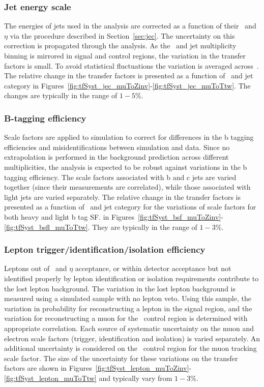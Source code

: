 \subsubsection{Jet energy scale}
\label{sec:tfSyst_jec}
The energies of jets used in the analysis are corrected as a function of their \pt~and
$\eta$ via the procedure described in Section~\ref{sec:jec}. The uncertainty on
this correction is propagated through the analysis. As the \scalht~and jet multiplicity binning is 
mirrored in signal and control regions, the variation in the transfer factors is small.
To avoid statistical fluctuations the variation is averaged across~\nb. The relative change 
in the transfer factors is presented as a function of \scalht~and jet category 
in Figures~\ref{fig:tfSyst_jec_muToZinv}-\ref{fig:tfSyst_jec_muToTtw}.
The changes are typically in the range of $1-5\%$.

\subsubsection{B-tagging efficiency}

Scale factors are applied to simulation to correct for differences in the 
b tagging efficiencies and misidentifications between simulation and data. 
Since no extrapolation is performed in the background prediction across different 
\nb multiplicities, the analysis is expected to be robust against variations in the 
b tagging efficiency. The scale factors associated with b and c jets are varied together 
(since their measurements are correlated), while those associated with light jets are varied separately.
The relative change in the transfer factors is presented as a function of \scalht~and jet category 
for the variations of scale factors for both heavy and light b tag SF.
in Figures~\ref{fig:tfSyst_bsf_muToZinv}-\ref{fig:tfSyst_bsfl_muToTtw}.
They are typically in the range of $1-3\%$.

\subsubsection{Lepton trigger/identification/isolation efficiency}
\label{sec:tfSyst_lepton}

Leptons out of \pt~and $\eta$ acceptance, or within detector
acceptance but not identified properly by lepton identification or isolation
requirements contribute to the lost lepton background. The variation 
in the lost lepton background is measured using a simulated sample with no lepton veto.
Using this sample, the variation in probability for reconstructing a lepton in the signal region,
and the variation for reconstructing a muon for the \mj~control region is determined with 
appropriate correlation. Each source of systematic uncertainty 
on the muon and electron scale factors (trigger, identification and isolation) is varied separately. 
An additional uncertainty is considered on the \mj~control region for the muon tracking
scale factor. The size of the uncertainty for these variations on the transfer factors are
shown in Figures~\ref{fig:tfSyst_lepton_muToZinv}-\ref{fig:tfSyst_lepton_muToTtw}
and typically vary from $1-3\%$.

